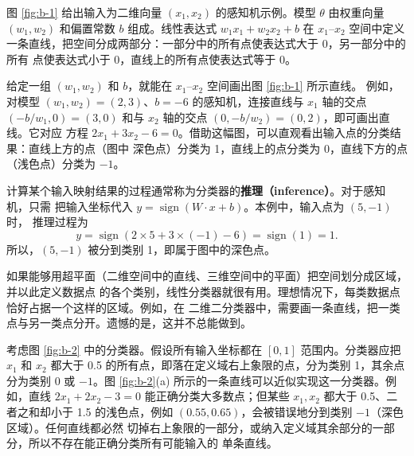 图 \ref{fig:b-1} 给出输入为二维向量 $(x_1,x_2)$ 的感知机示例。模型 $\theta$ 由权重向量
$(w_1,w_2)$ 和偏置常数 $b$ 组成。线性表达式 $w_1x_1+w_2x_2+b$ 在 $x_1$--$x_2$
空间中定义一条直线，把空间分成两部分：一部分中的所有点使表达式大于 0，另一部分中的所有
点使表达式小于 0，直线上的所有点使表达式等于 0。

给定一组 $(w_1,w_2)$ 和 $b$，就能在 $x_1$--$x_2$ 空间画出图 \ref{fig:b-1} 所示直线。
例如，对模型 $(w_1,w_2)=(2,3)$、$b=-6$ 的感知机，连接直线与 $x_1$ 轴的交点
$(-b/w_1,0)=(3,0)$ 和与 $x_2$ 轴的交点 $(0,-b/w_2)=(0,2)$，即可画出直线。它对应
方程 $2x_1+3x_2-6=0$。借助这幅图，可以直观看出输入点的分类结果：直线上方的点（图中
深色点）分类为 1，直线上的点分类为 0，直线下方的点（浅色点）分类为 $-1$。

计算某个输入映射结果的过程通常称为分类器的\textbf{推理（inference）}。对于感知机，只需
把输入坐标代入 $y=\operatorname{sign}(W\cdot x+b)$。本例中，输入点为 $(5,-1)$ 时，
推理过程为
\begin{equation}
  y=\operatorname{sign}(2\times5+3\times(-1)-6)=\operatorname{sign}(1)=1.
  \label{eq:appb-4}
\end{equation}
所以，$(5,-1)$ 被分到类别 1，即属于图中的深色点。

如果能够用超平面（二维空间中的直线、三维空间中的平面）把空间划分成区域，并以此定义数据点
的各个类别，线性分类器就很有用。理想情况下，每类数据点恰好占据一个这样的区域。例如，在
二维二分类器中，需要画一条直线，把一类点与另一类点分开。遗憾的是，这并不总能做到。

考虑图 \ref{fig:b-2} 中的分类器。假设所有输入坐标都在 $[0,1]$ 范围内。分类器应把 $x_1$
和 $x_2$ 都大于 0.5 的所有点，即落在定义域右上象限的点，分为类别 1，其余点分为类别 0
或 $-1$。图 \ref{fig:b-2}(a) 所示的一条直线可以近似实现这一分类器。例如，直线
$2x_1+2x_2-3=0$ 能正确分类大多数点；但某些 $x_1,x_2$ 都大于 0.5、二者之和却小于
1.5 的浅色点，例如 $(0.55,0.65)$，会被错误地分到类别 $-1$（深色区域）。任何直线都必然
切掉右上象限的一部分，或纳入定义域其余部分的一部分，所以不存在能正确分类所有可能输入的
单条直线。

